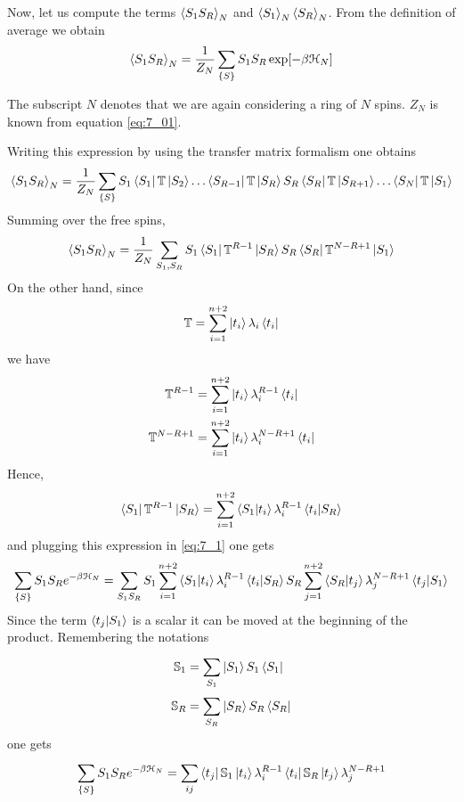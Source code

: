 \documentclass[../main/main.tex]{subfiles}
\begin{document}
Now, let us compute the terms \( \expval{S_1 S_R}_N  \) and \( \expval{S_1}_N\expval{S_R}_N \).
From the definition of average we obtain
\begin{equation}
  \expval{S_1 S_R}_N = \frac{1}{Z_N} \sum_{\{ S \}  }^{} S_1 S_R \exp [-\beta \mathcal{H}_N]
\end{equation}
\begin{remark}
The subscript \( N \) denotes that we are again considering a ring of \( N \) spins. \( Z_N \) is known from equation \eqref{eq:7_01}.
\end{remark}
Writing this expression by using the transfer matrix formalism one obtains
\begin{equation}
\expval{S_1 S_R}_N  = \frac{1}{Z_N} \sum_{\{ S \}  }^{} S_1 \bra{S_1} \mathbb{T} \ket{S_2} \dots  \bra{S_{R-1}} \mathbb{T} \ket{S_R} S_R \bra{S_R} \mathbb{T} \ket{S_{R+1}} \dots \bra{S_N} \mathbb{T} \ket{S_1}
\end{equation}
Summing over the free spins,
\begin{equation}
  \expval{S_1 S_R}_N = \frac{1}{Z_N} \sum_{S_1,S_R}^{} S_1 \bra{S_1} \mathbb{T}^{R-1} \ket{S_R} S_R \bra{S_R} \mathbb{T}^{N-R+1} \ket{S_1}
  \label{eq:7_1}
\end{equation}
On the other hand, since
\begin{equation}
  \mathbb{T} = \sum_{i=1}^{n+2} \ket{t_i} \lambda _i  \bra{t_i}
\end{equation}
we have
\begin{subequations}
\begin{align}
  \mathbb{T}^{R-1} &= \sum_{i=1}^{n+2} \ket{t_i} \lambda _i^{R-1}  \bra{t_i} \\
    \mathbb{T}^{N-R+1} &= \sum_{i=1}^{n+2} \ket{t_i} \lambda _i^{N-R+1}  \bra{t_i}
\end{align}
\end{subequations}
Hence,
\begin{equation}
  \bra{S_1} \mathbb{T}^{R-1} \ket{S_R} = \sum_{i=1}^{n+2} \braket{S_1}{t_i} \lambda_i ^{R-1} \braket{t_i}{S_R}
\end{equation}
and plugging this expression in  \eqref{eq:7_1} one gets
\begin{equation}
  \sum_{\{ S \}  }^{}  S_1 S_R e^{-\beta \mathcal{H}_N} = \sum_{S_1 S_R}^{} S_1 \sum_{i=1}^{n+2} \braket{S_1}{t_i} \lambda _i^{R-1} \braket{t_i}{S_R} S_R \sum_{j=1}^{n+2} \braket{S_R}{t_j} \lambda_j ^{N-R+1} \braket{t_j}{S_1}
\end{equation}
Since the term \( \braket{t_j}{S_1}  \) is a scalar it can be moved at the beginning of the product. Remembering the notations
\begin{subequations}
\begin{align}
  \mathbb{S}_1 &= \sum_{S_1}^{} \ket{S_1} S_1 \bra{S_1} \\
  \mathbb{S}_R &= \sum_{S_R}^{} \ket{S_R} S_R \bra{S_R}
\end{align}
\end{subequations}
one gets
\begin{equation}
  \sum_{\{ S \}  }^{}  S_1 S_R e^{-\beta \mathcal{H}_N}= \sum_{ij}^{} \bra{t_j } \mathbb{S}_1 \ket{t_i} \lambda _i^{R-1} \bra{t_i} \mathbb{S}_R \ket{t_j} \lambda _j ^{N-R+1}
\end{equation}
\end{document}
